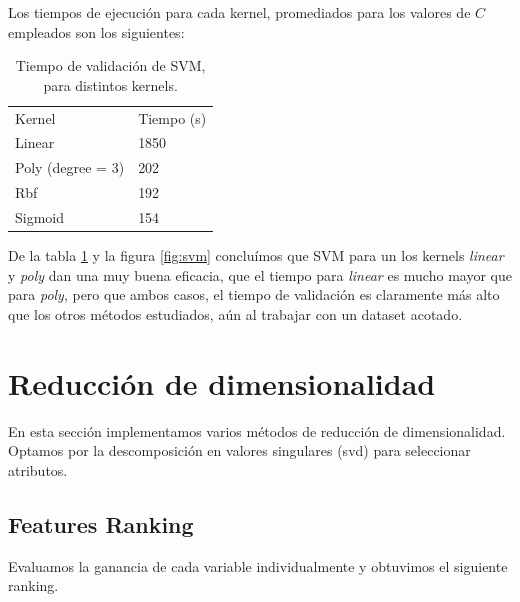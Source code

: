 \documentclass[a4paper,10pt]{article}
\begin{document}
\par Los tiempos de ejecución para cada kernel, promediados para los valores de $C$ empleados son los siguientes:
\begin{table}[H]
\centering
\label{table:time_svm}
\begin{tabular}{ll}
Kernel & Tiempo (s) \\
Linear & 1850 \\
Poly (degree = 3) & 202 \\
Rbf & 192 \\
Sigmoid & 154 \\
\end{tabular}
\caption{Tiempo de validación de SVM, para distintos kernels.}
\end{table}
De la tabla \ref{table:time_svm} y la figura \ref{fig:svm} concluímos que SVM para un los kernels \emph{linear} y \emph{poly} dan una muy buena eficacia, que el tiempo para \emph{linear} es mucho mayor que para \emph{poly}, pero que ambos casos, el tiempo de validación es claramente más alto que los otros métodos estudiados, aún al trabajar con un dataset acotado.


\section{Reducci\'on de dimensionalidad} \label{sec:seleccion}

En esta secci\'on implementamos varios m\'etodos de reducci\'on de dimensionalidad. Optamos por la descomposición en valores singulares (svd) para seleccionar atributos. 

\subsection{Features Ranking}

Evaluamos la ganancia de cada variable individualmente y obtuvimos el siguiente ranking. 
\end{document}
